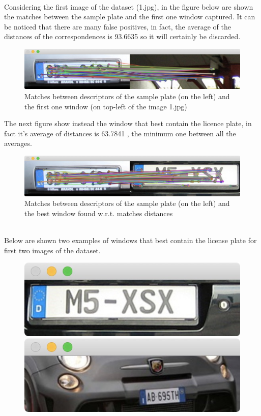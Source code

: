 \documentclass[11pt]{article}
\begin{document}
\begin{titlepage}
{\\Considering the first image of the dataset (1.jpg), in the figure below are shown the matches between the sample plate and the first one window captured. It can be noticed that there are many false positives, in fact, the average of the distances of the correspondences is 93.6635 so it will certainly be discarded.
\begin{figure}[htbp]
\centering
\includegraphics[totalheight=0.19\textwidth]{m1.jpg}
\caption{Matches between descriptors of the sample plate (on the left) and the first one window (on top-left of the image 1.jpg)}
\label{}
\end{figure}
\newpage
\noindent	
The next figure show instead the window that best contain the licence plate, in fact it's average of distances is 63.7841 , the minimum one between all the averages.
\begin{figure}[htbp]
\centering
\includegraphics[totalheight=0.19\textwidth]{m2.jpg}
\caption{Matches between descriptors of the sample plate (on the left) and the best window found w.r.t. matches distances}
\label{}
\end{figure}
\\Below are shown two examples of windows that best contain the license plate for first two images of the dataset.
\begin{figure}[htbp]
\centering
\includegraphics[totalheight=0.165\textwidth]{m3.jpg}
\includegraphics[totalheight=0.165\textwidth]{m4.jpg}

\end{figure}}
\end{titlepage}
\end{document}

